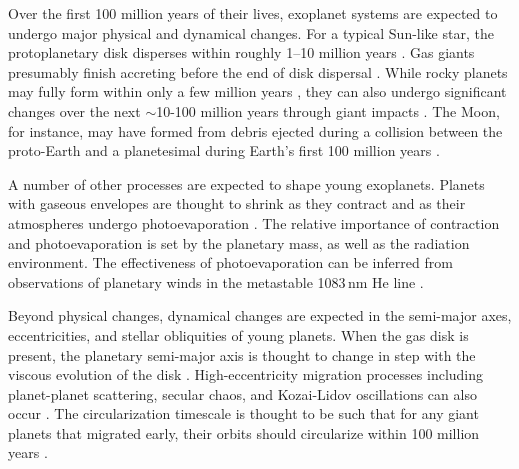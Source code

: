 \documentclass[12pt,twocolumn,tighten]{aastex63}
\begin{document}
Over the first 100 million years of their lives, exoplanet systems are
expected to undergo major physical and dynamical changes.  For a
typical Sun-like star, the protoplanetary disk disperses within
roughly 1--10 million years
\citep{mamajek_initial_2009,dullemond_inner_2010,williams_protoplanetary_2011}.
Gas giants presumably finish accreting before the end of disk
dispersal \citep{pollack_formation_1996}.  While rocky planets may
fully form within only a few million years
\citep{dauphas_hf-w-th_2011}, they can also undergo significant
changes over the next $\sim$10-100 million years through giant impacts
\citep[{\it
e.g.},][]{kleine_hf-w_2009,konig_earths_2011,raymond_terrestrial_2014}.
The Moon, for instance, may have formed from debris ejected during a
collision between the proto-Earth and a planetesimal during Earth's
first 100 million years \citep{cameron_origin_1976,canup_origin_2001}.

A number of other processes are expected to shape young exoplanets.
Planets with gaseous envelopes are thought to shrink as they contract
and as their atmospheres undergo photoevaporation \citep[{\it
e.g.},][]{Fortney_et_al_2007,Owen_Wu_2013,Fulton_et_al_2017}.  The
relative importance of contraction and photoevaporation is set by the
planetary mass, as well as the radiation environment.  The
effectiveness of photoevaporation can be inferred from observations of
planetary winds in the metastable 1083$\,$nm He line
\citep{spake_helium_2018,oklopcic_new_2018,mansfield_detection_2018}.

Beyond physical changes, dynamical changes are expected in the
semi-major axes, eccentricities, and stellar obliquities of young
planets.  When the gas disk is present, the planetary semi-major axis
is thought to change in step with the viscous evolution of the disk
\citep{lin_orbital_1996}.  High-eccentricity migration processes
including planet-planet scattering, secular chaos, and Kozai-Lidov
oscillations can also occur \citep[{\it
e.g.},][]{chatterjee_dynamical_2008,lithwick_secular_2014,fabrycky_shrinking_2007}.
The circularization timescale is thought to be such that for any giant
planets that migrated early, their orbits should circularize within
100 million years \citep{zahn_tidal_1977}.
\end{document}
